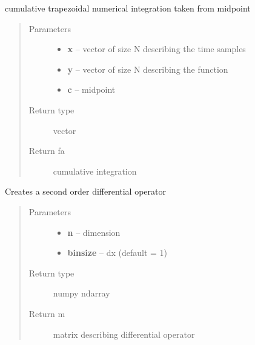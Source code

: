 \documentclass[letterpaper,10pt,english]{sphinxmanual}
\begin{document}

\begin{fulllineitems}
\label{utility_functions:utility_functions.cumtrapzmid}
cumulative trapezoidal numerical integration taken from midpoint
\begin{quote}\begin{description}
\item[{Parameters}] \leavevmode\begin{itemize}
\item {} 
\textbf{x} -- vector of size N describing the time samples

\item {} 
\textbf{y} -- vector of size N describing the function

\item {} 
\textbf{c} -- midpoint

\end{itemize}

\item[{Return type}] \leavevmode
vector

\item[{Return fa}] \leavevmode
cumulative integration

\end{description}\end{quote}

\end{fulllineitems}


\begin{fulllineitems}
\label{utility_functions:utility_functions.diffop}
Creates a second order differential operator
\begin{quote}\begin{description}
\item[{Parameters}] \leavevmode\begin{itemize}
\item {} 
\textbf{n} -- dimension

\item {} 
\textbf{binsize} -- dx (default = 1)

\end{itemize}

\item[{Return type}] \leavevmode
numpy ndarray

\item[{Return m}] \leavevmode
matrix describing differential operator

\end{description}\end{quote}

\end{fulllineitems}
\end{document}
